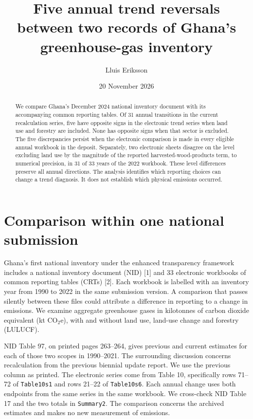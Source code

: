\documentclass[11pt]{article}
\title{Five annual trend reversals between two records of Ghana's greenhouse-gas inventory}
\author{Lluis Eriksson}\date{20 November 2026}
\begin{document}
\maketitle
\begin{abstract}
We compare Ghana's December 2024 national inventory document with its accompanying common reporting tables. Of 31 annual transitions in the current recalculation series, five have opposite signs in the electronic trend series when land use and forestry are included. None has opposite signs when that sector is excluded. The five discrepancies persist when the electronic comparison is made in every eligible annual workbook in the deposit. Separately, two electronic sheets disagree on the level excluding land use by the magnitude of the reported harvested-wood-products term, to numerical precision, in 31 of 33 years of the 2022 workbook. These level differences preserve all annual directions. The analysis identifies which reporting choices can change a trend diagnosis. It does not establish which physical emissions occurred.
\end{abstract}
\section{Comparison within one national submission}
Ghana's first national inventory under the enhanced transparency framework includes a national inventory document (NID) [1] and 33 electronic workbooks of common reporting tables (CRTs) [2]. Each workbook is labelled with an inventory year from 1990 to 2022 in the same submission version. A comparison that passes silently between these files could attribute a difference in reporting to a change in emissions. We examine aggregate greenhouse gases in kilotonnes of carbon dioxide equivalent (kt CO$_2$e), with and without land use, land-use change and forestry (LULUCF).

NID Table 97, on printed pages 263--264, gives previous and current estimates for each of those two scopes in 1990--2021. The surrounding discussion concerns recalculation from the previous biennial update report. We use the previous column as printed. The electronic series come from Table 10, specifically rows 71--72 of \texttt{Table10s1} and rows 21--22 of \texttt{Table10s6}. Each annual change uses both endpoints from the same series in the same workbook. We cross-check NID Table 17 and the two totals in \texttt{Summary2}. The comparison concerns the archived estimates and makes no new measurement of emissions.
\end{document}
